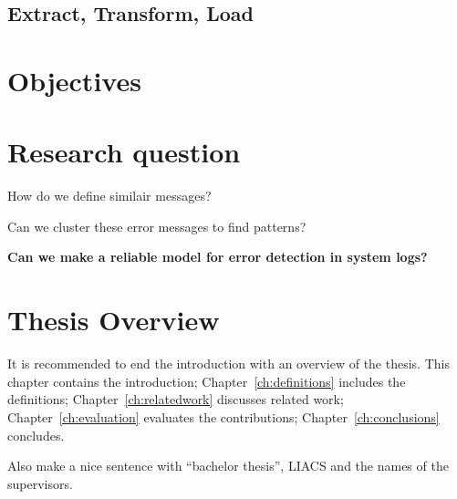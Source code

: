 \subsection{Extract, Transform, Load}


\section{Objectives}


\section{Research question}
How do we define similair messages?

Can we cluster these error messages to find patterns?


\textbf{Can we make a reliable model for error detection in system logs?}

 
\section{Thesis Overview}
It is recommended to end the introduction with an overview of the thesis. This chapter contains the introduction; Chapter~\ref{ch:definitions} includes the definitions; Chapter~\ref{ch:relatedwork} discusses related work; Chapter~\ref{ch:evaluation} evaluates the contributions; Chapter~\ref{ch:conclusions} concludes.

Also make a nice sentence with ``bachelor thesis'', LIACS and the names of the supervisors.

